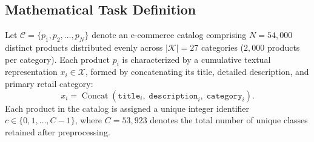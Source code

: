 \documentclass[11pt]{article}
\begin{document}
\subsection{Mathematical Task Definition}
Let $\mathcal{C} = \{p_1, p_2, \dots, p_N\}$ denote an e-commerce catalog comprising $N = 54{,}000$ distinct products distributed evenly across $|\mathcal{K}| = 27$ categories ($2{,}000$ products per category). Each product $p_i$ is characterized by a cumulative textual representation $x_i \in \mathcal{X}$, formed by concatenating its title, detailed description, and primary retail category:
\begin{equation}
  x_i = \operatorname{Concat}\left(\texttt{title}_i, \; \texttt{description}_i, \; \texttt{category}_i\right).
\end{equation}
Each product in the catalog is assigned a unique integer identifier $c \in \{0, 1, \dots, C-1\}$, where $C = 53{,}923$ denotes the total number of unique classes retained after preprocessing.
\end{document}
